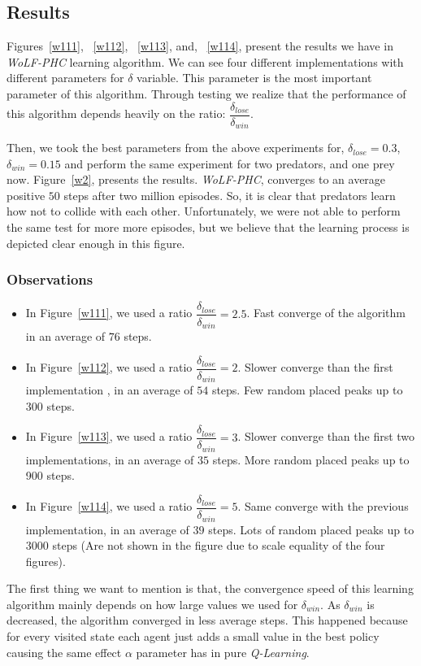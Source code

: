 \documentclass[a4paper,11pt]{article}
\begin{document}
\subsection{Results}
Figures~\ref{w111}, ~\ref{w112}, ~\ref{w113}, and, ~\ref{w114}, present the results we have in \textit{WoLF-PHC} learning algorithm. We can see four different implementations with different parameters for $\delta$ variable. This parameter is the most important parameter of this algorithm. Through testing we realize that the performance of this algorithm depends heavily on the ratio: $\dfrac{\delta_{lose}}{\delta_{win}}$.

Then, we took the best parameters from the above experiments for, $\delta_{lose} = 0.3$, $\delta_{win} = 0.15$ and perform the same experiment for two predators, and one prey now. Figure~\ref{w2}, presents the results. \textit{WoLF-PHC}, converges to an average positive $50$ steps after two million episodes. So, it is clear that predators learn how not to collide with each other. Unfortunately, we were not able to perform the same test for more more episodes, but we believe that the learning process is depicted clear enough in this figure.

\subsubsection{Observations}
\begin{itemize}
\item In Figure~\ref{w111}, we used a ratio $\dfrac{\delta_{lose}}{\delta_{win}} = 2.5$. Fast converge of the algorithm in an average of $76$ steps.
\item In Figure~\ref{w112}, we used a ratio $\dfrac{\delta_{lose}}{\delta_{win}} = 2$. Slower converge than the first implementation , in an average of $54$ steps. Few random placed peaks up to 300 steps.
\item In Figure~\ref{w113}, we used a ratio $\dfrac{\delta_{lose}}{\delta_{win}} = 3$. Slower converge than the first two implementations, in an average of $35$ steps. More random placed peaks up to 900 steps.
\item In Figure~\ref{w114}, we used a ratio $\dfrac{\delta_{lose}}{\delta_{win}} = 5$. Same converge with the previous implementation, in an average of $39$ steps. Lots of random placed peaks up to 3000 steps (Are not shown in the figure due to scale equality of the four figures).
\end{itemize}

The first thing we want to mention is that, the convergence speed of this learning algorithm mainly depends on how large values we used for $\delta_{win}$. As $\delta_{win}$ is decreased, the algorithm converged in less average steps. This happened because for every visited state each agent just adds a small value in the best policy causing the same effect $\alpha$ parameter has in pure \textit{Q-Learning}.
\end{document}

